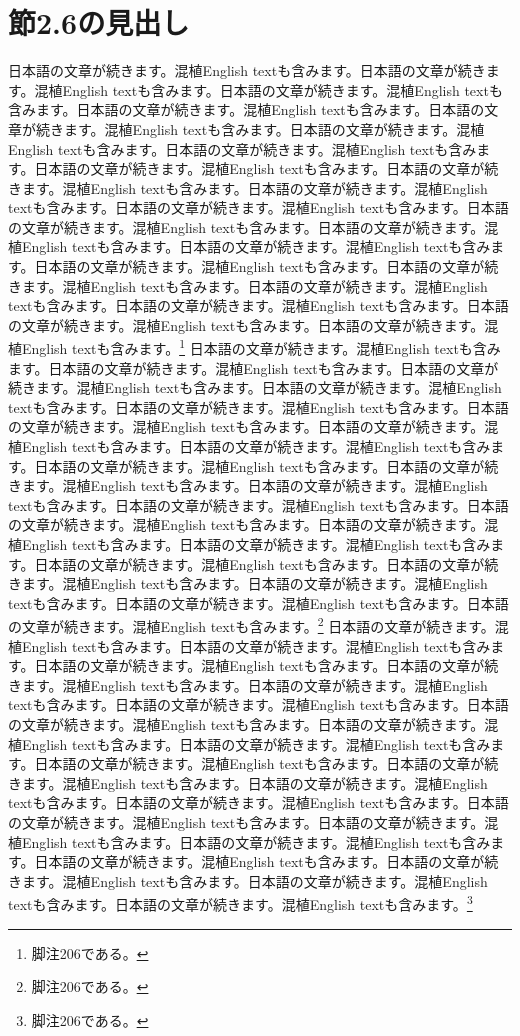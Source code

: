 \documentclass[pdflatex,book]{jlreq}
\begin{document}
\section{節2.6の見出し}
日本語の文章が続きます。混植English textも含みます。日本語の文章が続きます。混植English textも含みます。日本語の文章が続きます。混植English textも含みます。日本語の文章が続きます。混植English textも含みます。日本語の文章が続きます。混植English textも含みます。日本語の文章が続きます。混植English textも含みます。日本語の文章が続きます。混植English textも含みます。日本語の文章が続きます。混植English textも含みます。日本語の文章が続きます。混植English textも含みます。日本語の文章が続きます。混植English textも含みます。日本語の文章が続きます。混植English textも含みます。日本語の文章が続きます。混植English textも含みます。日本語の文章が続きます。混植English textも含みます。日本語の文章が続きます。混植English textも含みます。日本語の文章が続きます。混植English textも含みます。日本語の文章が続きます。混植English textも含みます。日本語の文章が続きます。混植English textも含みます。日本語の文章が続きます。混植English textも含みます。日本語の文章が続きます。混植English textも含みます。日本語の文章が続きます。混植English textも含みます。\footnote{脚注206である。}
日本語の文章が続きます。混植English textも含みます。日本語の文章が続きます。混植English textも含みます。日本語の文章が続きます。混植English textも含みます。日本語の文章が続きます。混植English textも含みます。日本語の文章が続きます。混植English textも含みます。日本語の文章が続きます。混植English textも含みます。日本語の文章が続きます。混植English textも含みます。日本語の文章が続きます。混植English textも含みます。日本語の文章が続きます。混植English textも含みます。日本語の文章が続きます。混植English textも含みます。日本語の文章が続きます。混植English textも含みます。日本語の文章が続きます。混植English textも含みます。日本語の文章が続きます。混植English textも含みます。日本語の文章が続きます。混植English textも含みます。日本語の文章が続きます。混植English textも含みます。日本語の文章が続きます。混植English textも含みます。日本語の文章が続きます。混植English textも含みます。日本語の文章が続きます。混植English textも含みます。日本語の文章が続きます。混植English textも含みます。日本語の文章が続きます。混植English textも含みます。\footnote{脚注206である。}
日本語の文章が続きます。混植English textも含みます。日本語の文章が続きます。混植English textも含みます。日本語の文章が続きます。混植English textも含みます。日本語の文章が続きます。混植English textも含みます。日本語の文章が続きます。混植English textも含みます。日本語の文章が続きます。混植English textも含みます。日本語の文章が続きます。混植English textも含みます。日本語の文章が続きます。混植English textも含みます。日本語の文章が続きます。混植English textも含みます。日本語の文章が続きます。混植English textも含みます。日本語の文章が続きます。混植English textも含みます。日本語の文章が続きます。混植English textも含みます。日本語の文章が続きます。混植English textも含みます。日本語の文章が続きます。混植English textも含みます。日本語の文章が続きます。混植English textも含みます。日本語の文章が続きます。混植English textも含みます。日本語の文章が続きます。混植English textも含みます。日本語の文章が続きます。混植English textも含みます。日本語の文章が続きます。混植English textも含みます。日本語の文章が続きます。混植English textも含みます。\footnote{脚注206である。}
\end{document}
